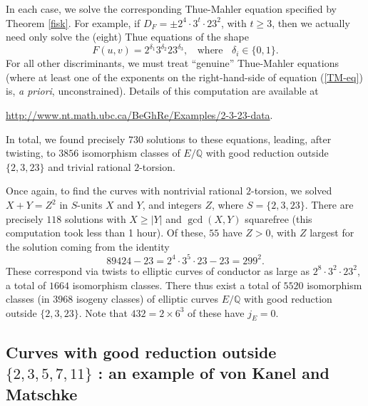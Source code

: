In each case, we solve the corresponding Thue-Mahler equation specified by Theorem \ref{fisk}. For example, if $D_F = \pm 2^4 \cdot 3^t \cdot 23^2$, with $t \geq 3$, then we actually need only solve the (eight) Thue equations of the shape
$$
F(u,v) = 2^{\delta_1} 3^{\delta_2} 23^{\delta_3}, \; \; \mbox{ where } \; \; \delta_i \in \{ 0, 1 \}.
$$
For all other discriminants, we must treat ``genuine'' Thue-Mahler equations (where at least one of the exponents on the right-hand-side of equation (\ref{TM-eq}) is, {\it a priori}, unconstrained). Details of this computation are available at 
\begin{center}
\url{http://www.nt.math.ubc.ca/BeGhRe/Examples/2-3-23-data}.
\end{center}
In total, we found precisely $730$ solutions to these equations, leading, after twisting, to $3856$ isomorphism classes of $E/\mathbb{Q}$ with good reduction outside $\{ 2, 3, 23 \}$ and trivial rational $2$-torsion.

Once again, to find the curves with nontrivial rational $2$-torsion, we solved $X+Y=Z^2$ in $S$-units $X$ and $Y$, and integers $Z$, where 
 $S=\{2,3, 23 \}$. There are precisely $118$ solutions with $X \geq |Y|$ and  $\gcd (X,Y)$ squarefree (this computation took less than 1 hour). Of these, $55$ have $Z > 0$, with $Z$ largest for the solution coming from  the identity
$$
89424 - 23 = 2^4\cdot 3^5\cdot 23 - 23 = 299^2.
$$
These correspond via twists to elliptic curves of conductor as large as $2^8\cdot 3^2 \cdot 23^2$, a total of $1664$ isomorphism classes. There thus exist a total of $5520$ isomorphism classes (in $3968$ isogeny classes) of elliptic curves $E/\mathbb{Q}$ with good reduction outside $\{ 2, 3, 23 \}$. Note that $432 = 2 \times 6^3$ of these have $j_E=0$.


\subsection{Curves with good reduction outside $\{ 2, 3, 5, 7, 11 \}$ : an example of von Kanel and Matschke} \label{gummy-bear}

